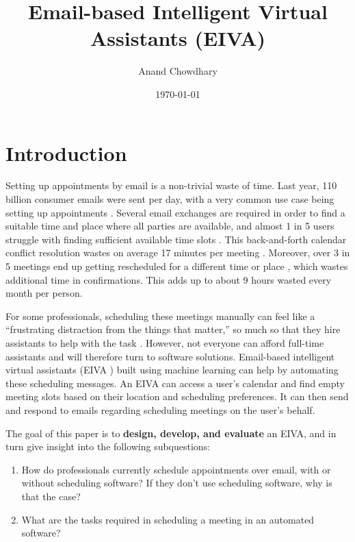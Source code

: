 \documentclass{article}
\title{Email-based Intelligent Virtual Assistants (EIVA)}
\author{Anand Chowdhary}
\date{\today}
\begin{document}
\maketitle
\newpage
\tableofcontents
\newpage
\listoffigures
\enspace
\listoftables
\newpage
{}
  

\section{Introduction}

Setting up appointments by email is a non-trivial waste of time. Last year, 110 billion consumer emails were sent per day, with a very common use case being setting up appointments \cite{noauthor_email_2019}. Several email exchanges are required in order to find a suitable time and place where all parties are available, and almost 1 in 5 users struggle with finding sufficient available time slots \cite{blaszkiewicz_research_2018}. This back-and-forth calendar conflict resolution wastes on average 17 minutes per meeting \cite{dennis_4_2017}. Moreover, over 3 in 5 meetings end up getting rescheduled for a different time or place \cite{dennis_how_2018}, which wastes additional time in confirmations. This adds up to about 9 hours wasted every month per person.

For some professionals, scheduling these meetings manually can feel like a “frustrating distraction from the things that matter,” so much so that they hire assistants to help with the task \cite{cranshaw_calendarhelp_2017}. However, not everyone can afford full-time assistants and will therefore turn to software solutions. Email-based intelligent virtual assistants (EIVA ) built using machine learning can help by automating these scheduling messages. An EIVA can access a user’s calendar and find empty meeting slots based on their location and scheduling preferences. It can then send and respond to emails regarding scheduling meetings on the user’s behalf.

The goal of this paper is to \textbf{design, develop, and evaluate} an EIVA, and in turn give insight into the following subquestions:

\begin{enumerate}
	\item How do professionals currently schedule appointments over email, with or without scheduling software? If they don’t use scheduling software, why is that the case?
	\item What are the tasks required in scheduling a meeting in an automated software?
\end{enumerate}
\end{document}
